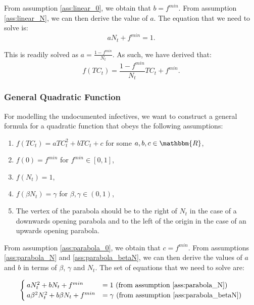 \documentclass[12pt]{article}
\newcommand{\R}{\mathbbm{R}}
\begin{document}
\begin{appendices}
		From assumption \ref{ass:linear_0}, we obtain that $b = f^{min}$. From assumption \ref{ass:linear_N}, we can then derive the value of $a$. The equation that we need to solve is:
		    \[aN_t + f^{min} = 1.\]
		    
		\noindent This is readily solved as $a = \frac{1-f^{min}}{N_t}$. As such, we have derived that:
		    \[f(TC_t) = \frac{1-f^{min}}{N_t}TC_t + f^{min}.\]
		
		\subsubsection{General Quadratic Function} \label{ssapp:quadratic_derivation}
		For modelling the undocumented infectives, we want to construct a general formula for a quadratic function that obeys the following assumptions:
		\begin{enumerate}[label=(\Roman*)]
		    \item\label{ass:parabola_formula} $f(TC_t) = aTC_t^2 + bTC_t + c$ for some $a, b, c \in \R$,
		    \item\label{ass:parabola_0} $f(0) = f^{min}$ for $f^{min} \in [0,1]$,
		    \item\label{ass:parabola_N} $f(N_t) = 1$,
		    \item\label{ass:parabola_betaN} $f(\beta N_t) = \gamma$ for $\beta, \gamma \in (0,1)$,
		    \item\label{ass:parabola_vertex} The vertex of the parabola should be to the right of $N_t$ in the case of a downwards opening parabola and to the left of the origin in the case of an upwards opening parabola.
		\end{enumerate}
		
		From assumption \ref{ass:parabola_0}, we obtain that $c = f^{min}$. From assumptions \ref{ass:parabola_N} and \ref{ass:parabola_betaN}, we can then derive the values of $a$ and $b$ in terms of $\beta$, $\gamma$ and $N_t$. The set of equations that we need to solve are:
		
		\begin{equation} \label{eq:set_parabola}
		    \begin{cases}
		        aN_t^2 + bN_t + f^{min} &= 1 \text{ (from assumption \ref{ass:parabola_N})}\\
		        a\beta^2 N_t^2 + b\beta N_t + f^{min} &= \gamma \text{ (from assumption \ref{ass:parabola_betaN})}
		    \end{cases}
		\end{equation}
		

\end{appendices}
\end{document}
